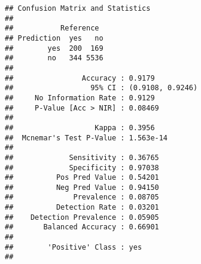 \documentclass[]{article}
\begin{document}
\begin{verbatim}
## Confusion Matrix and Statistics
## 
##           Reference
## Prediction  yes   no
##        yes  200  169
##        no   344 5536
##                                           
##                Accuracy : 0.9179          
##                  95% CI : (0.9108, 0.9246)
##     No Information Rate : 0.9129          
##     P-Value [Acc > NIR] : 0.08469         
##                                           
##                   Kappa : 0.3956          
##  Mcnemar's Test P-Value : 1.563e-14       
##                                           
##             Sensitivity : 0.36765         
##             Specificity : 0.97038         
##          Pos Pred Value : 0.54201         
##          Neg Pred Value : 0.94150         
##              Prevalence : 0.08705         
##          Detection Rate : 0.03201         
##    Detection Prevalence : 0.05905         
##       Balanced Accuracy : 0.66901         
##                                           
##        'Positive' Class : yes             
## 
\end{verbatim}
\end{document}
